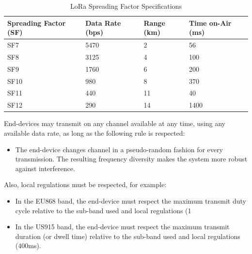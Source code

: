 \begin{table}[h!]
	\centering
	\caption{LoRa Spreading Factor Specifications} 
	\begin{tabular}{|l|l|l|l|}
		\hline
		\textbf{Spreading Factor (SF)} & \textbf{Data Rate (bps)} & \textbf{Range (km)} & \textbf{Time on-Air (ms)} \\ \hline
		SF7                            & 5470                    & 2                   & 56                       \\ \hline
		SF8                            & 3125                    & 4                   & 100                      \\ \hline
		SF9                            & 1760                    & 6                   & 200                      \\ \hline
		SF10                           & 980                     & 8                   & 370                      \\ \hline
		SF11                           & 440                     & 11                  & 40                       \\ \hline
		SF12                           & 290                     & 14                  & 1400                     \\ \hline
	\end{tabular}
	\label{tab:spreading-factor-specifications} 
\end{table}

End-devices may transmit on any channel available at any time, using any available data rate, as long as the following rule is respected:

\begin{itemize}
	\item The end-device changes channel in a pseudo-random fashion for every transmission. The resulting frequency diversity makes the system more robust against interference. \cite{ArduinoLoRaWAN101:2024}
\end{itemize}

Also, local regulations must be respected, for example:

\begin{itemize}
	\item In the EU868 band, the end-device must respect the maximum transmit duty cycle relative to the sub-band used and local regulations (1%
	\item In the US915 band, the end-device must respect the maximum transmit duration (or dwell time) relative to the sub-band used and local regulations (400ms). \cite{ArduinoLoRaWAN101:2024}
\end{itemize}

